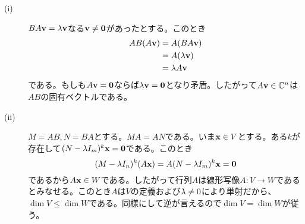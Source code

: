 \begin{sol} ${}$
  \begin{description}
    \item[(i)] $BA \textbf{v} = {\lambda} \textbf{v}$なる$\textbf{v} \neq \textbf{0}$があったとする。このとき
    \begin{align*}
      AB(A \textbf{v}) &= A(BA \textbf{v}) \\
      &= A ({\lambda} \textbf{v}) \\
      &= {\lambda} A \textbf{v}
    \end{align*}
    である。もしも$A \textbf{v} = \textbf{0}$ならば${\lambda} \textbf{v} = \textbf{0}$となり矛盾。したがって$A \textbf{v} \in {\mathbb C}^n$は$AB$の固有ベクトルである。
    \item[(ii)] $M = AB, N = BA$とする。$MA = AN$である。いま$\textbf{x} \in V$とする。ある$k$が存在して$(N - {\lambda} I_m)^k \textbf{x} = \textbf{0}$である。このとき
    \[
(M - {\lambda} I_n)^k (A \textbf{x}) = A  (N - {\lambda} I_m)^k \textbf{x} = \textbf{0}
    \]
    であるから$A \textbf{x} \in W$である。したがって行列$A$は線形写像$A \colon V \to W$であるとみなせる。このとき$A$は$V$の定義および${\lambda} \neq 0$により単射だから、$\dim V \leq \dim W$である。同様にして逆が言えるので$\dim V = \dim W$が従う。
  \end{description}
\end{sol}

\newpage


